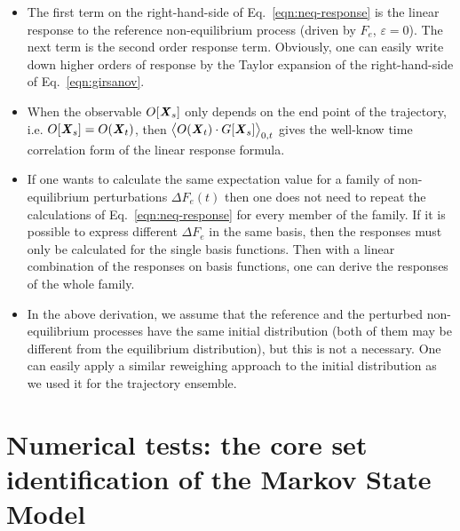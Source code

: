 \documentclass[aip,jcp,a4paper,reprint,onecolumn]{revtex4-1}
\newcommand{\vect}[1]{\textbf{\textit{#1}}}
\newcommand{\eps}{\varepsilon}
\begin{document}
\begin{itemize}
\item The first term on the right-hand-side of Eq.~\eqref{eqn:neq-response} is the linear
  response to the reference non-equilibrium process (driven by $F_e$, $\eps=0$). The next term is the second order response term. Obviously, one can easily write down higher orders of response by the Taylor expansion of the right-hand-side of Eq.~\eqref{eqn:girsanov}.
\item When the observable $O[\vect X_s]$ only depends on the end point of the trajectory, i.e.
  $O[\vect X_s] = O(\vect X_t)$, then $\big\langle O(\vect X_t)\cdot G[\vect X_s]\big\rangle_{0,t}$
  gives the well-know time correlation form of the linear response formula.
\item If one wants to calculate the same expectation value for a family of non-equilibrium perturbations $\Delta F_e(t)$ then 
one does not need to repeat the calculations of Eq.~\eqref{eqn:neq-response} for every member of the family. 
  If it is possible to
  express different $\Delta F_e$ in the same basis, then the responses must only be
  calculated for the single basis functions. Then with a linear combination of the responses on basis functions, one can derive
  the responses of the whole family. 
\item In the above derivation, we assume that the reference and the perturbed non-equilibrium processes
  have the same initial distribution (both of them may be different from the equilibrium distribution),
  but this is not a necessary. One can easily
  apply a similar reweighing approach to the initial distribution as we used it for the trajectory ensemble.
\end{itemize}













\section{Numerical tests: the core set identification of  the Markov State Model }
\end{document}

